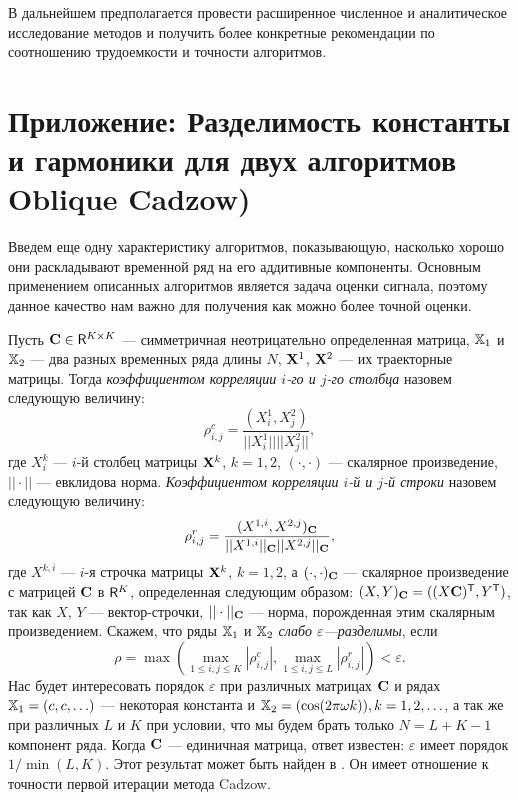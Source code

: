 \documentclass[12pt,a4paper,fleqn,leqno]{article}
\begin{document}
В дальнейшем предполагается провести расширенное численное и аналитическое исследование методов и получить более конкретные рекомендации по
соотношению трудоемкости и точности алгоритмов.




\section{Приложение: Разделимость константы и гармоники для двух алгоритмов Oblique Cadzow)}
\label{sec:app}

Введем еще одну характеристику алгоритмов, показывающую, насколько хорошо они раскладывают временной ряд на его аддитивные компоненты. Основным применением описанных алгоритмов является задача оценки сигнала, поэтому данное качество нам важно для получения как можно более точной оценки.

Пусть $\mathbf{C} \in \mathsf{R}^{K \times K}$ --- симметричная неотрицательно определенная матрица, $\mathbb{X}_1$ и $\mathbb{X}_2$ ---  два разных временных ряда длины $N$, $\mathbf{X}^1$, $\mathbf{X}^2$ --- их траекторные матрицы. Тогда \emph{коэффициентом корреляции $i$-го и $j$-го столбца} назовем следующую величину:
\begin{equation}\label{col_corr}
\rho^c_{i,j} = \frac{(X^1_i, X^2_j)}{||X^1_i|| ||X^2_j||},
\end{equation}
где $X^k_i$ --- $i$-й столбец матрицы $\mathbf{X}^k$, $k = 1, 2$, $(\cdot, \cdot)$ --- скалярное произведение, $||\cdot||$ --- евклидова норма. \emph{Коэффициентом корреляции $i$-й и $j$-й строки} назовем следующую величину:
\begin{equation}\label{row_corr}
\rho^r_{i,j} = \frac{(X^{1,i}, X^{2,j})_{\mathbf{C}}}{||X^{1,i}||_{\mathbf{C}} ||X^{2,j}||_{\mathbf{C}}},
\end{equation}
где $X^{k,i}$ --- $i$-я строчка матрицы $\mathbf{X}^k$, $k = 1, 2$, а $(\cdot, \cdot)_{\mathbf{C}}$ --- скалярное произведение с матрицей $\mathbf{C}$ в $\mathsf{R}^K$, определенная следующим образом: $(X, Y)_{\mathbf{C}} = ((X\mathbf{C})^{\mathsf{T}}, Y^{\mathsf{T}})$, так как $X$, $Y$ --- вектор-строчки, $|| \cdot ||_{\mathbf{C}}$ --- норма, порожденная этим скалярным произведением. Скажем, что ряды $\mathbb{X}_1$ и $\mathbb{X}_2$ \emph{слабо $\varepsilon$---разделимы}, если
\begin{equation}\label{weak_sep_eq}
\rho = \max(\max_{1 \le i,j \le K}|\rho^c_{i,j}|, \max_{1 \le i,j \le L}|\rho^r_{i,j}|) < \varepsilon.
\end{equation}
Нас будет интересовать порядок $\varepsilon$ при различных матрицах $\mathbf{C}$ и рядах $\mathbb{X}_1 = (c, c, \ldots)$ --- некоторая константа и $\mathbb{X}_2 = (\cos(2 \pi \omega k)), k = 1, 2, \ldots$, а так же при различных $L$ и $K$ при условии, что мы будем брать только $N = L + K - 1$ компонент ряда. Когда $\mathbf{C}$ --- единичная матрица, ответ известен: $\varepsilon$ имеет порядок $1/\min(L,K)$. Этот результат может быть найден в \cite[Раздел 6.1]{Golyandina.etal2001}. Он имеет отношение к точности первой итерации метода Cadzow.
\end{document}
